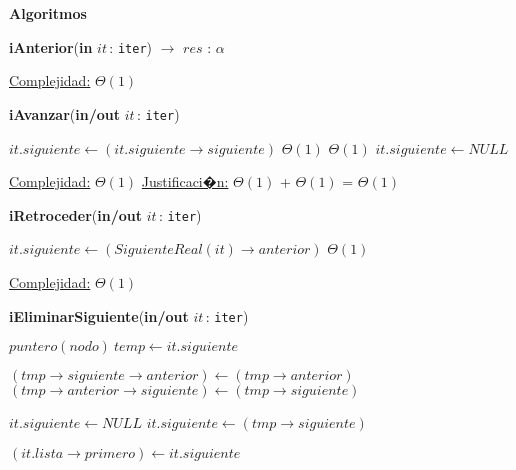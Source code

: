 \documentclass[a4paper,10pt]{article}
\let\TipoVariable=\texttt
\let\ModificadorArgumento=\textbf
\newcommand{\In}[2]{\ModificadorArgumento{in} \ensuremath{#1}\,: \TipoVariable{#2}\xspace}
\newcommand{\Inout}[2]{\ModificadorArgumento{in/out} \ensuremath{#1}\,: \TipoVariable{#2}\xspace}
\newenvironment{Algoritmos}{%
  \vspace*{2ex}%
  \noindent\textbf{\Large Algoritmos}%
  \vspace*{2ex}%
}{}
\begin{document}
\begin{Algoritmos}
\begin{algorithm}[H]{\textbf{iAnterior}(\In{it}{iter}) $\to$ $res$ : $\alpha$}
\begin{algorithmic}[1]
			\medskip
			\Statex \underline{Complejidad:} $\Theta(1)$
    	\end{algorithmic}
\end{algorithm}



\begin{algorithm}[H]
	\begin{algorithmic}[1]
		\State \textbf{iAvanzar}(\Inout{it}{iter})
		
			\State $it.siguiente \gets (it.siguiente\rightarrow siguiente)$	\Comment $\Theta(1)$
				\Comment $\Theta(1)$
				\State $it.siguiente \gets NULL$	
			\EndIf

			\medskip
			\Statex \underline{Complejidad:} $\Theta(1)$
			\Statex \underline{Justificaci�n:}  $\Theta(1)$ + $\Theta(1)$ = $\Theta(1)$
    	\end{algorithmic}
\end{algorithm}
	
	
\begin{algorithm}[H]
	\begin{algorithmic}[1]
		\State \textbf{iRetroceder}(\Inout{it}{iter})
		
			\State $it.siguiente \gets (SiguienteReal(it)\rightarrow anterior)$	\Comment $\Theta(1)$

			\medskip
			\Statex \underline{Complejidad:} $\Theta(1)$
    	\end{algorithmic}
\end{algorithm}
	
	
\begin{algorithm}[H]
	\begin{algorithmic}[1]
		\State \textbf{iEliminarSiguiente}(\Inout{it}{iter})
		
			\State $puntero(nodo) \ temp \gets it.siguiente$
			
			\State $(tmp\rightarrow siguiente\rightarrow anterior) \gets (tmp\rightarrow anterior)$
			\State $(tmp\rightarrow anterior\rightarrow siguiente) \gets (tmp\rightarrow siguiente)$
		
				\State $it.siguiente \gets NULL$
			\Else
				\State $it.siguiente \gets (tmp\rightarrow siguiente)$	
			\EndIf
			
				\State $(it.lista\rightarrow primero) \gets it.siguiente$
			\EndIf
			

\end{algorithmic}
\end{algorithm}
\end{Algoritmos}
\end{document}
